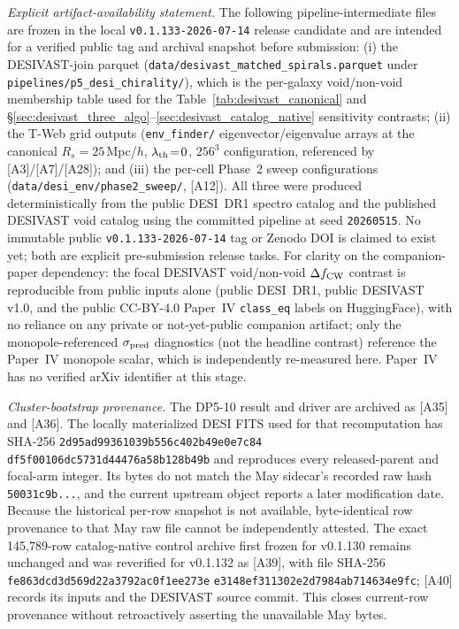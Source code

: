 \documentclass[aps,prd,twocolumn,superscriptaddress,showpacs,preprintnumbers,nofootinbib,longbibliography,floatfix]{revtex4-2}
\newcommand{\paperVersion}{v0.1.133-2026-07-14}
\begin{document}
\emph{Explicit artifact-availability statement.}
The following pipeline-intermediate files are frozen in the local
\texttt{\paperVersion} release candidate and are intended for a verified
public tag and archival snapshot before submission:
(i) the DESIVAST-join parquet
(\texttt{data/desivast\_matched\_spirals.parquet} under
\texttt{pipelines/p5\_desi\_chirality/}),
which is the per-galaxy void/non-void membership table used for the
Table~\ref{tab:desivast_canonical} and
\S\ref{sec:desivast_three_algo}--\ref{sec:desivast_catalog_native}
sensitivity contrasts;
(ii) the T-Web grid outputs
(\texttt{env\_finder/} eigenvector/eigenvalue arrays at the
canonical $R_s\!=\!25$\,Mpc/$h$, $\lambda_{\rm th}\!=\!0$, $256^3$
configuration, referenced by [A3]/[A7]/[A28]);
and (iii) the per-cell Phase~2 sweep configurations
(\texttt{data/desi\_env/phase2\_sweep/}, [A12]).
All three were produced deterministically from the public DESI~DR1
spectro catalog and the published DESIVAST void catalog using the
committed pipeline at seed \texttt{20260515}.
No immutable public \texttt{\paperVersion} tag or Zenodo DOI is claimed to
exist yet; both are explicit pre-submission release tasks. For clarity on the
companion-paper dependency: the focal DESIVAST void/non-void
$\Delta f_{\rm CW}$ contrast is reproducible from public inputs alone
(public DESI~DR1, public DESIVAST v1.0, and the public CC-BY-4.0 Paper~IV
\texttt{class\_eq} labels on HuggingFace), with no reliance on any private
or not-yet-public companion artifact; only the monopole-referenced
$\sigma_{\rm pred}$ diagnostics (not the headline contrast) reference the
Paper~IV monopole scalar, which is independently re-measured here.
Paper~IV has no verified arXiv identifier at this stage.

\emph{Cluster-bootstrap provenance.} The DP5-10 result and driver are
archived as [A35] and [A36]. The locally materialized DESI FITS used for
that recomputation has SHA-256
\texttt{2d95ad99361039b5}\allowbreak\texttt{56c402b49e0e7c84}\allowbreak
\texttt{df5f00106dc5731d}\allowbreak\texttt{44476a58b128b49b}
and reproduces every released-parent and focal-arm integer. Its bytes
do not match the May sidecar's recorded raw hash
\texttt{50031c9b...}, and the current upstream object reports a later
modification date. Because the historical per-row snapshot is not
available, byte-identical row provenance to that May raw file cannot be
independently attested. The exact 145,789-row catalog-native control
archive first frozen for v0.1.130 remains unchanged and was reverified for
v0.1.132 as [A39], with file SHA-256
\texttt{fe863dcd3d569d22a3792ac0f1ee273e}
\texttt{e3148ef311302e2d7984ab714634e9fc}; [A40] records its inputs and the
DESIVAST source commit. This closes current-row provenance without
retroactively asserting the unavailable May bytes.
\end{document}
